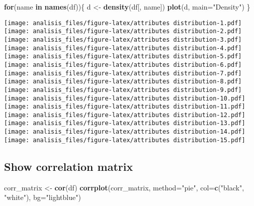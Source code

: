 \documentclass[]{article}
\newenvironment{Shaded}{\begin{snugshade}}{\end{snugshade}}
\newcommand{\ControlFlowTok}[1]{\textcolor[rgb]{0.13,0.29,0.53}{\textbf{#1}}}
\newcommand{\DataTypeTok}[1]{\textcolor[rgb]{0.13,0.29,0.53}{#1}}
\newcommand{\KeywordTok}[1]{\textcolor[rgb]{0.13,0.29,0.53}{\textbf{#1}}}
\newcommand{\NormalTok}[1]{#1}
\newcommand{\StringTok}[1]{\textcolor[rgb]{0.31,0.60,0.02}{#1}}
\begin{document}
\begin{Shaded}
\begin{Highlighting}[]
\ControlFlowTok{for}\NormalTok{(name }\ControlFlowTok{in} \KeywordTok{names}\NormalTok{(df))\{}
\NormalTok{  d <-}\StringTok{ }\KeywordTok{density}\NormalTok{(df[, name])}
  \KeywordTok{plot}\NormalTok{(d, }\DataTypeTok{main=}\StringTok{"Density"}\NormalTok{)}
\NormalTok{\}}
\end{Highlighting}
\end{Shaded}

\texttt{[image: analisis\_files/figure-latex/attributes distribution-1.pdf]}
\texttt{[image: analisis\_files/figure-latex/attributes distribution-2.pdf]}
\texttt{[image: analisis\_files/figure-latex/attributes distribution-3.pdf]}
\texttt{[image: analisis\_files/figure-latex/attributes distribution-4.pdf]}
\texttt{[image: analisis\_files/figure-latex/attributes distribution-5.pdf]}
\texttt{[image: analisis\_files/figure-latex/attributes distribution-6.pdf]}
\texttt{[image: analisis\_files/figure-latex/attributes distribution-7.pdf]}
\texttt{[image: analisis\_files/figure-latex/attributes distribution-8.pdf]}
\texttt{[image: analisis\_files/figure-latex/attributes distribution-9.pdf]}
\texttt{[image: analisis\_files/figure-latex/attributes distribution-10.pdf]}
\texttt{[image: analisis\_files/figure-latex/attributes distribution-11.pdf]}
\texttt{[image: analisis\_files/figure-latex/attributes distribution-12.pdf]}
\texttt{[image: analisis\_files/figure-latex/attributes distribution-13.pdf]}
\texttt{[image: analisis\_files/figure-latex/attributes distribution-14.pdf]}
\texttt{[image: analisis\_files/figure-latex/attributes distribution-15.pdf]}

\hypertarget{show-correlation-matrix}{%
\subsection{Show correlation matrix}\label{show-correlation-matrix}}

\begin{Shaded}
\begin{Highlighting}[]
\NormalTok{corr_matrix <-}\StringTok{ }\KeywordTok{cor}\NormalTok{(df)}
\KeywordTok{corrplot}\NormalTok{(corr_matrix, }\DataTypeTok{method=}\StringTok{"pie"}\NormalTok{, }\DataTypeTok{col=}\KeywordTok{c}\NormalTok{(}\StringTok{"black"}\NormalTok{, }\StringTok{"white"}\NormalTok{), }\DataTypeTok{bg=}\StringTok{"lightblue"}\NormalTok{)}
\end{Highlighting}
\end{Shaded}
\end{document}

